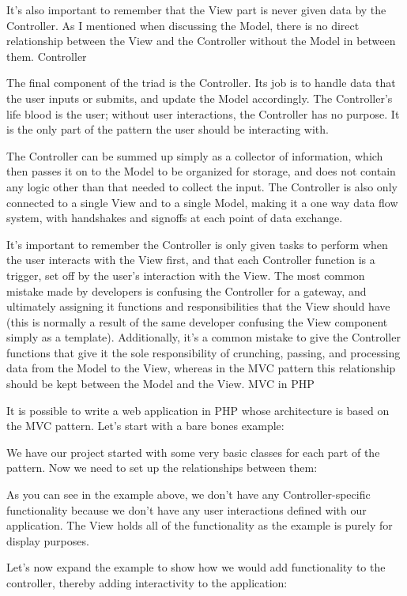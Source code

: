 \documentclass[a4paper,openany,twoside,draft]{book}
\begin{document}
It’s also important to remember that the View part is never given data by the Controller. As I mentioned when discussing the Model, there is no direct relationship between the View and the Controller without the Model in between them.
Controller

The final component of the triad is the Controller. Its job is to handle data that the user inputs or submits, and update the Model accordingly. The Controller’s life blood is the user; without user interactions, the Controller has no purpose. It is the only part of the pattern the user should be interacting with.

The Controller can be summed up simply as a collector of information, which then passes it on to the Model to be organized for storage, and does not contain any logic other than that needed to collect the input. The Controller is also only connected to a single View and to a single Model, making it a one way data flow system, with handshakes and signoffs at each point of data exchange.

It’s important to remember the Controller is only given tasks to perform when the user interacts with the View first, and that each Controller function is a trigger, set off by the user’s interaction with the View. The most common mistake made by developers is confusing the Controller for a gateway, and ultimately assigning it functions and responsibilities that the View should have (this is normally a result of the same developer confusing the View component simply as a template). Additionally, it’s a common mistake to give the Controller functions that give it the sole responsibility of crunching, passing, and processing data from the Model to the View, whereas in the MVC pattern this relationship should be kept between the Model and the View.
MVC in PHP

It is possible to write a web application in PHP whose architecture is based on the MVC pattern. Let’s start with a bare bones example:


We have our project started with some very basic classes for each part of the pattern. Now we need to set up the relationships between them:


As you can see in the example above, we don’t have any Controller-specific functionality because we don’t have any user interactions defined with our application. The View holds all of the functionality as the example is purely for display purposes.

Let’s now expand the example to show how we would add functionality to the controller, thereby adding interactivity to the application:
\end{document}
